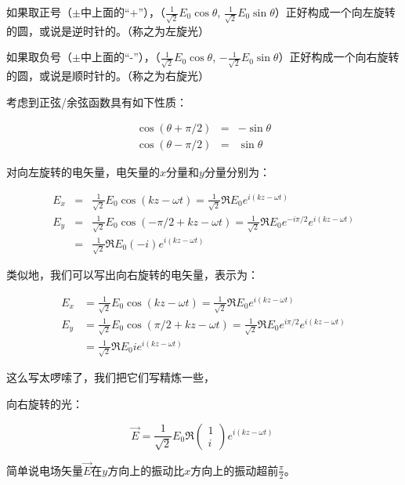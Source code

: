 \begin{enumerate}
如果取正号（$\pm$中上面的“+”），（$ \frac{1}{\sqrt{2}} E_0 \cos \theta$, $ \frac{1}{\sqrt{2}} E_0 \sin \theta$）正好构成一个向左旋转的圆，或说是逆时针的。（称之为左旋光）

如果取负号（$\pm$中上面的“-”），（$ \frac{1}{\sqrt{2}} E_0 \cos \theta$, $ - \frac{1}{\sqrt{2}} E_0 \sin \theta$）正好构成一个向右旋转的圆，或说是顺时针的。（称之为右旋光）

考虑到正弦/余弦函数具有如下性质：

\begin{align}
\cos (\theta + \pi /2 ) &=& - \sin \theta \\
\cos (\theta -  \pi /2 ) &=& \sin \theta~
\end{align}

对向左旋转的电矢量，电矢量的$x$分量和$y$分量分别为：

\begin{align}
E_x &=& \frac{1}{\sqrt{2}}  E_0 \cos (k z - \omega t) = \frac{1}{\sqrt{2}}  \Re E_0 e^{i (k z - \omega t)}  \\
E_y &=& \frac{1}{\sqrt{2}}  E_0 \cos ( - \pi /2 +  kz - \omega t  ) = \frac{1}{\sqrt{2}}  \Re E_0 e^{ - i \pi /2 } e^{i (kz - \omega t)} \\
{} &=& \frac{1}{\sqrt{2}}  \Re E_0 (-i) e^{i (kz - \omega t)}~
\end{align}

类似地，我们可以写出向右旋转的电矢量，表示为：

\begin{align}
E_x &= \frac{1}{\sqrt{2}}  E_0 \cos (k z - \omega t) = \frac{1}{\sqrt{2}}  \Re E_0 e^{i (k z - \omega t)}  \\
E_y &= \frac{1}{\sqrt{2}}  E_0 \cos ( \pi /2 +  kz - \omega t  ) = \frac{1}{\sqrt{2}}  \Re E_0 e^{ i \pi /2 } e^{i (kz - \omega t)} \\
{} & =  \frac{1}{\sqrt{2}}  \Re E_0 i e^{i (kz - \omega t)} ~
\end{align}

这么写太啰嗦了，我们把它们写精炼一些，

向右旋转的光：

\begin{equation}
\vec E = \frac{1}{\sqrt{2}} E_0 \Re \left(
\begin{array}{c}
1 \\  i
\end{array}
\right) e^{i (kz - \omega t)}~
\end{equation}

简单说电场矢量$\vec E$在$y$方向上的振动比$x$方向上的振动超前$\frac{\pi}{2}$。


\end{enumerate}
